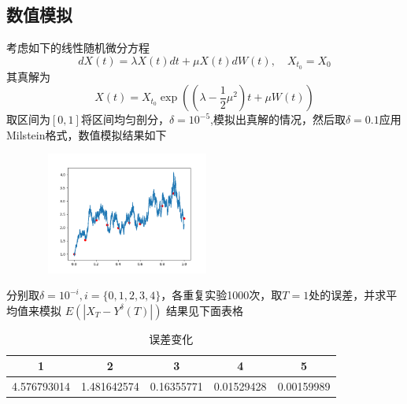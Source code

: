 \documentclass{article}%
\begin{document}
\subsection{数值模拟}
考虑如下的线性随机微分方程
\begin{equation}d X(t)=\lambda X(t) d t+\mu X(t) d W(t), \quad X_{t_0}=X_{0}\end{equation}
其真解为
\begin{equation}X(t)=X_{t_0} \exp \left(\left(\lambda-\frac{1}{2} \mu^{2}\right) t+\mu W(t)\right)\end{equation}
取区间为$[0,1]$将区间均匀剖分，$\delta=10^{-5}$,模拟出真解的情况，然后取$\delta=0.1$应用Milstein格式，数值模拟结果如下
\begin{figure}[h]
	\centering
	\includegraphics[width=6cm,height=4cm]{Figure_2.png}\\
	\centering	
\end{figure}
分别取$\delta=10^{-i},i=\{0,1,2,3,4\}$，各重复实验1000次，取$T=1$处的误差，并求平均值来模拟
$E\left(\left|X_{T}-Y^{\delta}(T)\right|\right)$
结果见下面表格
\begin{table}[htbp]
	\centering
	\caption{误差变化}
	\begin{tabular}{ccccc}
		\toprule  %
		1&2&3&4&5 \\ 
		\midrule  %
		4.576793014&1.481642574&0.16355771&0.01529428&0.00159989 \\
		\bottomrule  %
	\end{tabular}
\end{table}
\end{document}

